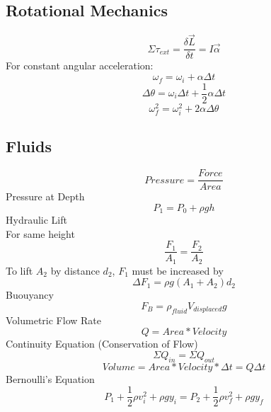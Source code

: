 \documentclass{article}
\begin{document}
\subsection{Rotational Mechanics}
\begin{equation}\Sigma \tau _{ext} = \frac{\delta \vec{L}}{\delta t} = I\vec{\alpha}\end{equation}
For constant angular acceleration:
\begin{equation}\omega_{f} = \omega_{i} + \alpha\Delta t\end{equation}
\begin{equation}\Delta \theta = \omega_{i} \Delta t + \frac{1}{2}\alpha\Delta t\end{equation}
\begin{equation}\omega_{f}^2 = \omega_{i}^2 + 2\alpha\Delta \theta\end{equation}

\subsection{Fluids}
\begin{equation}Pressure = \frac{Force}{Area}\end{equation}
Pressure at Depth
\begin{equation}P_{1} = P_{0} + \rho gh\end{equation}
Hydraulic Lift\\For same height\begin{equation} \frac{F_{1}}{A_{1}} = \frac{F_{2}}{A_{2}} \end{equation}
To lift $A_{2}$ by distance $d_{2}$, $F_{1}$ must be increased by
 \begin{equation} \Delta F_{1} = \rho g(A_{1} + A_{2})d_{2}\end{equation}
 Buouyancy
 \begin{equation}F_{B} = \rho_{fluid}V_{displaced}g\end{equation}
 Volumetric Flow Rate
  \begin{equation}Q = Area*Velocity\end{equation}
  Continuity Equation (Conservation of Flow)
  \begin{equation}\Sigma Q_{in} = \Sigma Q_{out} \end{equation}
  \begin{equation}Volume = Area*Velocity*\Delta t = Q\Delta t\end{equation}
Bernoulli's Equation
 \begin{equation}P_{1} + \frac{1}{2}\rho v_{i}^2 + \rho gy_{i} =P_{2} + \frac{1}{2}\rho v_{f}^2 + \rho gy_{f}\end{equation}
\end{document}
